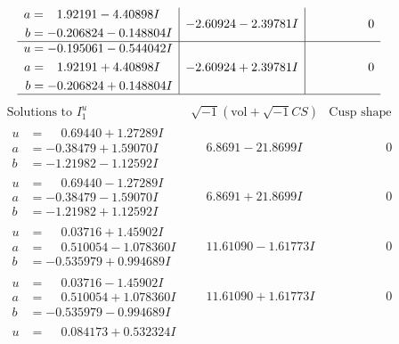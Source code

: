 \documentclass[1p]{elsarticle_modified}
\theoremstyle{definition}
\newcommand{\I}{\sqrt{-1}}
\begin{document}
$$\begin{array}{c|c|c}
\begin{aligned}
a &= \phantom{-}1.92191 - 4.40898 I \\
b &= -0.206824 - 0.148804 I\end{aligned}
 & -2.60924 - 2.39781 I & \phantom{-0.000000 } 0 \\ \hline\begin{aligned}
u &= -0.195061 - 0.544042 I \\
a &= \phantom{-}1.92191 + 4.40898 I \\
b &= -0.206824 + 0.148804 I\end{aligned}
 & -2.60924 + 2.39781 I & \phantom{-0.000000 } 0\\
 \hline 
 \end{array}$$\newpage$$\begin{array}{c|c|c}  
\text{Solutions to }I^u_{1}& \I (\text{vol} + \sqrt{-1}CS) & \text{Cusp shape}\\
 \hline 
\begin{aligned}
u &= \phantom{-}0.69440 + 1.27289 I \\
a &= -0.38479 + 1.59070 I \\
b &= -1.21982 - 1.12592 I\end{aligned}
 & \phantom{-}6.8691 - 21.8699 I & \phantom{-0.000000 } 0 \\ \hline\begin{aligned}
u &= \phantom{-}0.69440 - 1.27289 I \\
a &= -0.38479 - 1.59070 I \\
b &= -1.21982 + 1.12592 I\end{aligned}
 & \phantom{-}6.8691 + 21.8699 I & \phantom{-0.000000 } 0 \\ \hline\begin{aligned}
u &= \phantom{-}0.03716 + 1.45902 I \\
a &= \phantom{-}0.510054 - 1.078360 I \\
b &= -0.535979 + 0.994689 I\end{aligned}
 & \phantom{-}11.61090 - 1.61773 I & \phantom{-0.000000 } 0 \\ \hline\begin{aligned}
u &= \phantom{-}0.03716 - 1.45902 I \\
a &= \phantom{-}0.510054 + 1.078360 I \\
b &= -0.535979 - 0.994689 I\end{aligned}
 & \phantom{-}11.61090 + 1.61773 I & \phantom{-0.000000 } 0 \\ \hline\begin{aligned}
u &= \phantom{-}0.084173 + 0.532324 I \\

\end{aligned}
\end{array}$$
\end{document}
